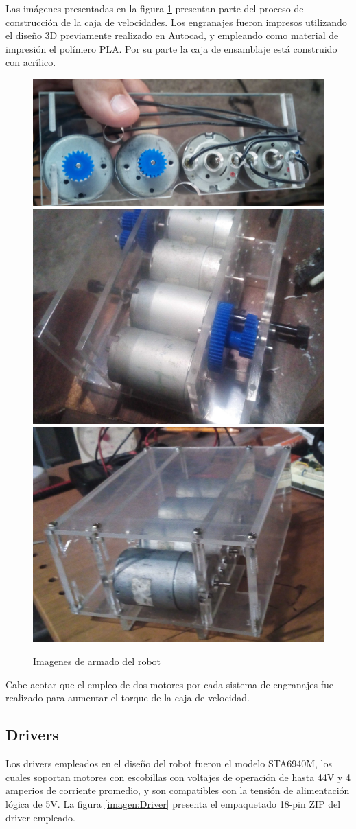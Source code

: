 Las imágenes presentadas en la figura \ref{imagen:construccionFinalRobot} presentan parte del proceso de construcción de la caja de velocidades. Los engranajes fueron impresos utilizando el diseño 3D previamente realizado en Autocad, y empleando como material de impresión el polímero PLA.  Por su parte la caja de ensamblaje está construido con acrílico.


\begin{figure}[H]
	\centering		\includegraphics[width=0.7\linewidth]{imagenes/prototipo/Motores}
	\includegraphics[width=0.4\linewidth]{imagenes/prototipo/CajaColocandoEngranejes}
	\includegraphics[width=0.4\linewidth]{imagenes/prototipo/CajaLista}

	\caption{Imagenes de armado del robot}
	\label{imagen:construccionFinalRobot}
\end{figure}

Cabe acotar que el empleo de dos motores por cada sistema de engranajes fue realizado para aumentar el torque de la caja de velocidad.

\subsection{Drivers}

Los drivers empleados en el diseño del robot fueron el modelo STA6940M, los cuales soportan motores con escobillas con voltajes de operación de hasta 44V y 4 amperios de corriente promedio, y son compatibles con la tensión de alimentación lógica de 5V. La figura \ref{imagen:Driver} presenta el empaquetado 18-pin ZIP del driver empleado.

